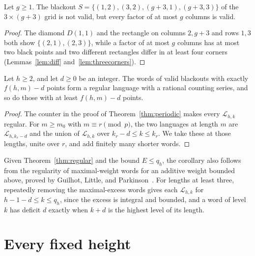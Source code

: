 \begin{proposition}\label{prop:nonlocal}
Let $g\ge1$. The blackout $S=\{(1,2),(3,2),(g+3,1),(g+3,3)\}$ of the $3\times(g+3)$ grid is not valid, but every factor of at most $g$ columns is valid.
\end{proposition}

\begin{proof}
The diamond $D(1,1)$ and the rectangle on columns $2,g+3$ and rows $1,3$ both show $\{(2,1),(2,3)\}$, while a factor of at most $g$ columns has at most two black points and two different rectangles differ in at least four corners (Lemmas~\ref{lem:diff} and~\ref{lem:threecorners}).
\end{proof}

\begin{corollary}\label{cor:deficit}
Let $h\ge2$, and let $d\ge0$ be an integer. The words of valid blackouts with exactly $f(h,m)-d$ points form a regular language with a rational counting series, and so do those with at least $f(h,m)-d$ points.
\end{corollary}

\begin{proof}
The counter in the proof of Theorem~\ref{thm:periodic} makes every $\mathcal L_{h,k}$ regular. For $m\ge m_0$ with $m\equiv r\pmod p$, the two languages at length $m$ are $\mathcal L_{h,k_r-d}$ and the union of $\mathcal L_{h,k}$ over $k_r-d\le k\le k_r$. We take these at those lengths, unite over $r$, and add finitely many shorter words.
\end{proof}

Given Theorem~\ref{thm:regular} and the bound $E\le q_h$,
the corollary also follows from the regularity of maximal-weight words for an additive
weight bounded above, proved by Guilhot, Little, and Parkinson~\cite[Theorem~1(3)]{glp2025}.
For lengths at least three, repeatedly removing the maximal-excess words gives each
$\mathcal L_{h,k}$ for $h-1-d\le k\le q_h$, since the excess is integral and bounded, and a
word of level $k$ has deficit $d$ exactly when $k+d$ is the highest level of its length.

\section{Every fixed height}\label{sec:height}

